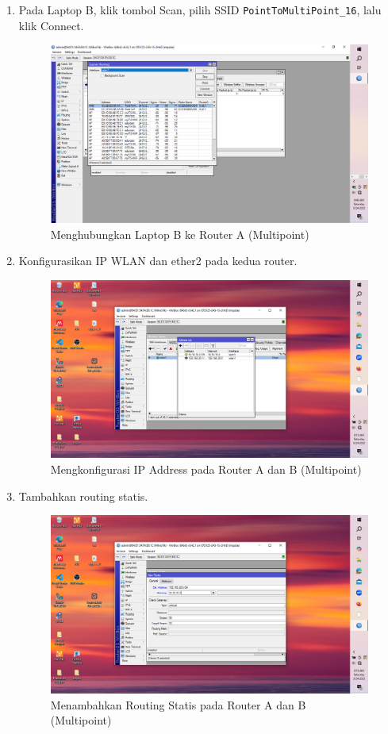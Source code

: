 \begin{enumerate}
    \item Pada Laptop B, klik tombol Scan, pilih SSID \texttt{PointToMultiPoint\_16}, lalu klik Connect.
    \begin{figure}[H]
        \centering
        \includegraphics[width=0.5\linewidth]{gambar3m.png}
        \caption{Menghubungkan Laptop B ke Router A (Multipoint)}
        \label{fig:hubungkan-laptop-multi}
    \end{figure}

    \item Konfigurasikan IP WLAN dan ether2 pada kedua router.
    \begin{figure}[H]
        \centering
        \includegraphics[width=0.5\linewidth]{gambar4.png}
        \caption{Mengkonfigurasi IP Address pada Router A dan B (Multipoint)}
        \label{fig:ip-router-multi}
    \end{figure}

    \item Tambahkan routing statis.
    \begin{figure}[H]
        \centering
        \includegraphics[width=0.5\linewidth]{gambar5.png}
        \caption{Menambahkan Routing Statis pada Router A dan B (Multipoint)}
        \label{fig:routing-multi}
    \end{figure}


\end{enumerate}
